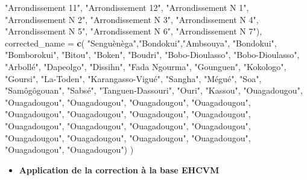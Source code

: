 \documentclass[
]{article}
\newenvironment{Shaded}{\begin{snugshade}}{\end{snugshade}}
\newcommand{\AttributeTok}[1]{\textcolor[rgb]{0.13,0.29,0.53}{#1}}
\newcommand{\FunctionTok}[1]{\textcolor[rgb]{0.13,0.29,0.53}{\textbf{#1}}}
\newcommand{\NormalTok}[1]{#1}
\newcommand{\StringTok}[1]{\textcolor[rgb]{0.31,0.60,0.02}{#1}}
\providecommand{\tightlist}{%
  \setlength{\itemsep}{0pt}\setlength{\parskip}{0pt}}
\begin{document}
\begin{Shaded}
\begin{Highlighting}[]
    \StringTok{"Arrondissement 11"}\NormalTok{, }\StringTok{"Arrondissement 12"}\NormalTok{,}
    \StringTok{"Arrondissement N 1"}\NormalTok{, }\StringTok{"Arrondissement N 2"}\NormalTok{,}
    \StringTok{"Arrondissement N 3"}\NormalTok{, }\StringTok{"Arrondissement N 4"}\NormalTok{,}
    \StringTok{"Arrondissement N 5"}\NormalTok{, }\StringTok{"Arrondissement N 6"}\NormalTok{,}
    \StringTok{"Arrondissement N 7"}\NormalTok{),}
  \AttributeTok{corrected\_name =} \FunctionTok{c}\NormalTok{(}
    \StringTok{"Senguènèga"}\NormalTok{,}\StringTok{"Bondokui"}\NormalTok{,}\StringTok{"Ambsouya"}\NormalTok{, }\StringTok{"Bondokui"}\NormalTok{, }
    \StringTok{"Bomborokui"}\NormalTok{, }\StringTok{"Bitou"}\NormalTok{, }\StringTok{"Boken"}\NormalTok{, }\StringTok{"Boudri"}\NormalTok{,}
    \StringTok{"Bobo{-}Dioulasso"}\NormalTok{, }\StringTok{"Bobo{-}Dioulasso"}\NormalTok{, }\StringTok{"Arbollé"}\NormalTok{,}
    \StringTok{"Dapeolgo"}\NormalTok{, }\StringTok{"Dissihn"}\NormalTok{, }\StringTok{"Fada Ngourma"}\NormalTok{, }\StringTok{"Gounguen"}\NormalTok{,}
    \StringTok{"Kokologo"}\NormalTok{, }\StringTok{"Goursi"}\NormalTok{, }\StringTok{"La{-}Toden"}\NormalTok{, }\StringTok{"Karangasso{-}Vigué"}\NormalTok{,}
    \StringTok{"Sangha"}\NormalTok{, }\StringTok{"Mégué"}\NormalTok{, }\StringTok{"Soa"}\NormalTok{, }\StringTok{"Samôgôgouan"}\NormalTok{, }\StringTok{"Sabsé"}\NormalTok{,}
    \StringTok{"Tanguen{-}Dassouri"}\NormalTok{, }\StringTok{"Ouri"}\NormalTok{, }\StringTok{"Kassou"}\NormalTok{, }\StringTok{"Ouagadougou"}\NormalTok{, }
    \StringTok{"Ouagadougou"}\NormalTok{, }\StringTok{"Ouagadougou"}\NormalTok{, }\StringTok{"Ouagadougou"}\NormalTok{,}
    \StringTok{"Ouagadougou"}\NormalTok{, }\StringTok{"Ouagadougou"}\NormalTok{, }\StringTok{"Ouagadougou"}\NormalTok{,}
    \StringTok{"Ouagadougou"}\NormalTok{, }\StringTok{"Ouagadougou"}\NormalTok{, }\StringTok{"Ouagadougou"}\NormalTok{,}
    \StringTok{"Ouagadougou"}\NormalTok{, }\StringTok{"Ouagadougou"}\NormalTok{, }\StringTok{"Ouagadougou"}\NormalTok{,}
    \StringTok{"Ouagadougou"}\NormalTok{, }\StringTok{"Ouagadougou"}\NormalTok{, }\StringTok{"Ouagadougou"}\NormalTok{,}
    \StringTok{"Ouagadougou"}\NormalTok{, }\StringTok{"Ouagadougou"}\NormalTok{, }\StringTok{"Ouagadougou"}\NormalTok{)}
\NormalTok{)}
\end{Highlighting}
\end{Shaded}

\begin{itemize}
\tightlist
\item
  \textbf{Application de la correction à la base EHCVM}
\end{itemize}
\end{document}
